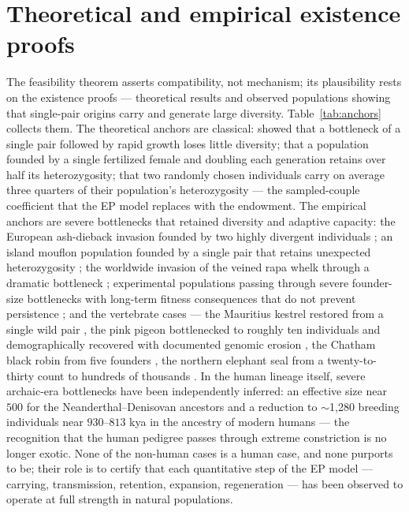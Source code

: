 \section{Theoretical and empirical existence proofs}\label{sec:emp}
The feasibility theorem asserts compatibility, not mechanism; its
plausibility rests on the existence proofs --- theoretical results and
observed populations showing that single-pair origins carry and generate
large diversity. Table~\ref{tab:anchors} collects them. The theoretical
anchors are classical: \citet{Nei1975} showed that a bottleneck of a
single pair followed by rapid growth loses little diversity;
\citet{BartonCharlesworth1984} that a population founded by a single
fertilized female and doubling each generation retains over half its
heterozygosity; \citet{SlatkinExcoffier2012} that two randomly chosen
individuals carry on average three quarters of their population's
heterozygosity --- the sampled-couple coefficient that the EP model
replaces with the endowment. The empirical anchors are severe
bottlenecks that retained diversity and adaptive capacity: the European
ash-dieback invasion founded by two highly divergent individuals
\citep{McMullan2018}; an island mouflon population founded by a single
pair that retains unexpected heterozygosity \citep{Kaeuffer2007}; the
worldwide invasion of the veined rapa whelk through a dramatic bottleneck
\citep{Xue2018}; experimental populations passing through severe
founder-size bottlenecks with long-term fitness consequences that do not
prevent persistence \citep{Szucs2017}; and the vertebrate cases --- the
Mauritius kestrel restored from a single wild pair
\citep{Ewing2008}, the pink pigeon bottlenecked to roughly ten individuals
and demographically recovered with documented genomic erosion
\citep{Jackson2022}, the Chatham black robin from five
founders \citep{vonSeth2022}, the northern elephant seal from a
twenty-to-thirty count to hundreds of thousands
\citep{Hoelzel2024}. In the human lineage itself, severe archaic-era
bottlenecks have been independently inferred: an effective size near $500$
for the Neanderthal--Denisovan ancestors \citep{Rogers2020} and a
reduction to $\sim$1,280 breeding individuals near $930$--$813$ kya in the
ancestry of modern humans \citep{Hu2023} --- the recognition that the
human pedigree passes through extreme constriction is no longer exotic.
None of the non-human cases is a human case, and none purports to
be; their role is to certify that each quantitative step of the EP model
--- carrying, transmission, retention, expansion, regeneration --- has
been observed to operate at full strength in natural populations.


